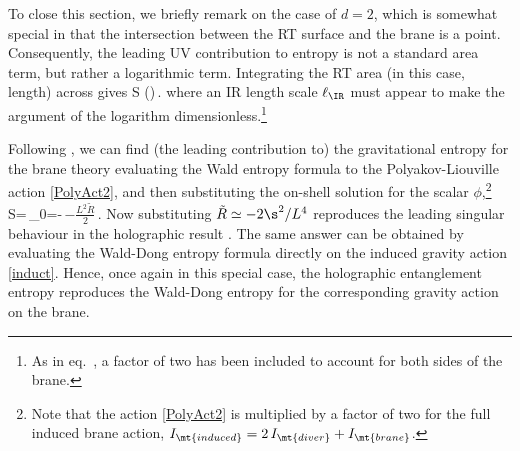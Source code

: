 
To close this section, we briefly remark on the case of $d=2$, which is somewhat special in that the intersection between the RT surface and the brane is a point. Consequently, the leading UV contribution to entropy is not a standard area term, but rather a logarithmic term. Integrating the RT area (in this case, length) across gives
\beq
S
\simeq {} \log\left(\frac{\ell_\IR}{\s}\right)\,.
\label{eq:kaboom}
\eeq
where an IR length scale $\ell_\IR$ must appear to make the argument of the logarithm dimensionless.\footnote{As in eq.~, a factor of two has been included to account for both sides of the brane.} 

Following \cite{Myers:1994sg}, we can find (the leading contribution to) the gravitational entropy for the brane theory evaluating the Wald entropy formula \cite{Wald:1993nt} to the Polyakov-Liouville action \eqref{PolyAct2}, and then substituting the on-shell solution  for the scalar $\phi$,\footnote{Note that the action \eqref{PolyAct2} is multiplied by a factor of two for the full induced brane action,  \ie $I_\mt{induced} = 2\,I_\mt{diver} + I_\mt{brane}$.}
\beq\label{arc}
S=\,\phi_0=-\,\log\!\(-\frac{L^2\tilde R}{2}\)\,.
\eeq
Now substituting $\tilde R\simeq -2\s^2/L^4$ reproduces the leading singular behaviour in the holographic result . The same answer can be obtained by evaluating the Wald-Dong entropy formula \cite{Wald:1993nt,Dong:2013qoa} directly on the induced gravity action \eqref{induct}. Hence, once again in this special case, the holographic entanglement entropy  reproduces the Wald-Dong entropy for the corresponding gravity action on the brane.


